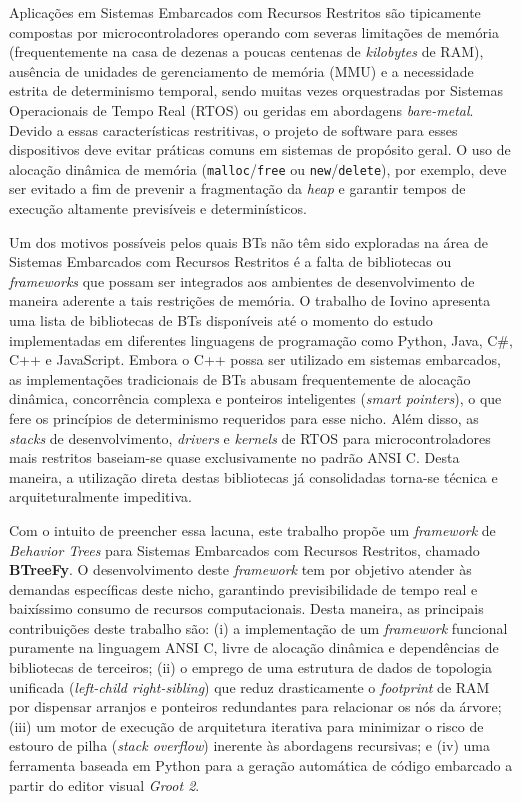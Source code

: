 \documentclass[conference]{IEEEtran}
\begin{document}
Aplicações em Sistemas Embarcados com Recursos Restritos são tipicamente compostas por microcontroladores operando com severas limitações de memória (frequentemente na casa de dezenas a poucas centenas de \textit{kilobytes} de RAM), ausência de unidades de gerenciamento de memória (MMU) e a necessidade estrita de determinismo temporal, sendo muitas vezes orquestradas por Sistemas Operacionais de Tempo Real (RTOS) ou geridas em abordagens \textit{bare-metal}. Devido a essas características restritivas, o projeto de software para esses dispositivos deve evitar práticas comuns em sistemas de propósito geral. O uso de alocação dinâmica de memória (\texttt{malloc}/\texttt{free} ou \texttt{new}/\texttt{delete}), por exemplo, deve ser evitado a fim de prevenir a fragmentação da \textit{heap} e garantir tempos de execução altamente previsíveis e determinísticos.

Um dos motivos possíveis pelos quais BTs não têm sido exploradas na área de Sistemas Embarcados com Recursos Restritos é a falta de bibliotecas ou \textit{frameworks} que possam ser integrados aos ambientes de desenvolvimento de maneira aderente a tais restrições de memória. O trabalho de Iovino \cite{iovino_survey_2022} apresenta uma lista de bibliotecas de BTs disponíveis até o momento do estudo implementadas em diferentes linguagens de programação como Python, Java, C\#, C++ e JavaScript. Embora o C++ possa ser utilizado em sistemas embarcados, as implementações tradicionais de BTs abusam frequentemente de alocação dinâmica, concorrência complexa e ponteiros inteligentes (\textit{smart pointers}), o que fere os princípios de determinismo requeridos para esse nicho. Além disso, as \textit{stacks} de desenvolvimento, \textit{drivers} e \textit{kernels} de RTOS para microcontroladores mais restritos baseiam-se quase exclusivamente no padrão ANSI C. Desta maneira, a utilização direta destas bibliotecas já consolidadas torna-se técnica e arquiteturalmente impeditiva.

Com o intuito de preencher essa lacuna, este trabalho propõe um \textit{framework} de \textit{Behavior Trees} para Sistemas Embarcados com Recursos Restritos, chamado \textbf{BTreeFy}. O desenvolvimento deste \textit{framework} tem por objetivo atender às demandas específicas deste nicho, garantindo previsibilidade de tempo real e baixíssimo consumo de recursos computacionais. Desta maneira, as principais contribuições deste trabalho são: (i) a implementação de um \textit{framework} funcional puramente na linguagem ANSI C, livre de alocação dinâmica e dependências de bibliotecas de terceiros; (ii) o emprego de uma estrutura de dados de topologia unificada (\textit{left-child right-sibling}) que reduz drasticamente o \textit{footprint} de RAM por dispensar arranjos e ponteiros redundantes para relacionar os nós da árvore; (iii) um motor de execução de arquitetura iterativa para minimizar o risco de estouro de pilha (\textit{stack overflow}) inerente às abordagens recursivas; e (iv) uma ferramenta baseada em Python para a geração automática de código embarcado a partir do editor visual \textit{Groot 2}.
\end{document}
